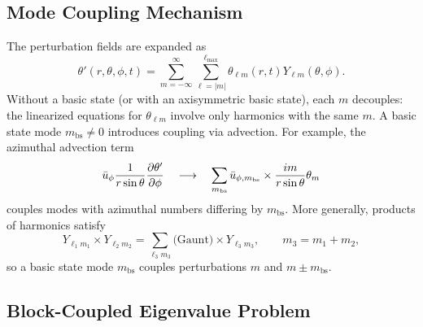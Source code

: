 \documentclass[11pt]{article}
\numberwithin{equation}{section}
\begin{document}
\subsection{Mode Coupling Mechanism}

The perturbation fields are expanded as
\begin{equation}
  \theta'(r,\theta,\phi,t) = \sum_{m=-\infty}^{\infty} \sum_{\ell=|m|}^{\ell_{\max}} \theta_{\ell m}(r,t) Y_{\ell m}(\theta,\phi).
  \label{eq:theta_pert_3d}
\end{equation}
Without a basic state (or with an axisymmetric basic state), each $m$ decouples: the linearized equations for $\theta_{\ell m}$ involve only harmonics with the same $m$. A basic state mode $m_{\text{bs}}\neq0$ introduces coupling via advection. For example, the azimuthal advection term
\begin{equation}
  \bar{u}_\phi \frac{1}{r\sin\theta} \pdv{\theta'}{\phi}
  \quad\longrightarrow\quad
  \sum_{m_{\text{bs}}} \bar{u}_{\phi,m_{\text{bs}}} \times \frac{im}{r\sin\theta} \theta_m
  \label{eq:azimuthal_coupling}
\end{equation}
couples modes with azimuthal numbers differing by $m_{\text{bs}}$. More generally, products of harmonics satisfy
\begin{equation}
  Y_{\ell_1 m_1} \times Y_{\ell_2 m_2} = \sum_{\ell_3 m_3} \text{(Gaunt)} \times Y_{\ell_3 m_3},
  \qquad m_3 = m_1 + m_2,
  \label{eq:gaunt}
\end{equation}
so a basic state mode $m_{\text{bs}}$ couples perturbations $m$ and $m\pm m_{\text{bs}}$.

\subsection{Block-Coupled Eigenvalue Problem}
\end{document}

